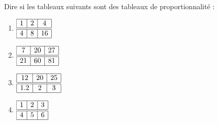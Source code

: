 
\begin{exercice}\label{exo2smath-0112}

    Dire si les tableaux suivants sont des tableaux de proportionnalité :
    \begin{multicols}{2}
    \begin{enumerate}
        \item
                $\begin{array}[]{|c|c|c|}
                    \hline
                    1&2&4\\
                    \hline\hline
                    4&8&16\\
                    \hline
                \end{array}
                $
               \item
                      $ \begin{array}[]{|c|c|c|}
                           \hline
                           7&20&27\\
                           \hline\hline
                           21&60&81\\
                           \hline
                       \end{array}
                       $
        \item
               $ \begin{array}[]{|c|c|c|}
                    \hline
                     12&20&25\\
                      \hline\hline
                      1.2&2&3\\ 
                      \hline 
                       \end{array}$
                   \item
         $       \begin{array}[]{|c|c|c|}
                    \hline
                    1&2&3\\
                    \hline\hline
                    4&5&6\\
                    \hline
                \end{array}$
    \end{enumerate}
    \end{multicols}

\end{exercice}
